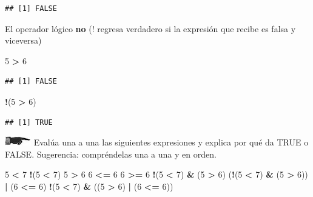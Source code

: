 \documentclass[]{book}
\newenvironment{Shaded}{\begin{snugshade}}{\end{snugshade}}
\newcommand{\DecValTok}[1]{\textcolor[rgb]{0.00,0.00,0.81}{#1}}
\newcommand{\StringTok}[1]{\textcolor[rgb]{0.31,0.60,0.02}{#1}}
\newcommand{\OperatorTok}[1]{\textcolor[rgb]{0.81,0.36,0.00}{\textbf{#1}}}
\newcommand{\NormalTok}[1]{#1}
\theoremstyle{definition}
\theoremstyle{definition}
\theoremstyle{definition}
\theoremstyle{remark}
\begin{document}
\begin{verbatim}
## [1] FALSE
\end{verbatim}

El operador lógico \textbf{no} (! regresa verdadero si la expresión que
recibe es falsa y viceversa)

\begin{Shaded}
\begin{Highlighting}[]
\DecValTok{5} \OperatorTok{>}\StringTok{ }\DecValTok{6}
\end{Highlighting}
\end{Shaded}

\begin{verbatim}
## [1] FALSE
\end{verbatim}

\begin{Shaded}
\begin{Highlighting}[]
\OperatorTok{!}\NormalTok{(}\DecValTok{5} \OperatorTok{>}\StringTok{ }\DecValTok{6}\NormalTok{)}
\end{Highlighting}
\end{Shaded}

\begin{verbatim}
## [1] TRUE
\end{verbatim}

\includegraphics{./imagenes/manicule2.jpg} Evalúa una a una las
siguientes expresiones y explica por qué da TRUE o FALSE. Sugerencia:
compréndelas una a una y en orden.

\begin{Shaded}
\begin{Highlighting}[]
\DecValTok{5} \OperatorTok{<}\StringTok{ }\DecValTok{7}
\OperatorTok{!}\NormalTok{(}\DecValTok{5} \OperatorTok{<}\StringTok{ }\DecValTok{7}\NormalTok{)}
\DecValTok{5} \OperatorTok{>}\StringTok{ }\DecValTok{6}
\DecValTok{6} \OperatorTok{<=}\StringTok{ }\DecValTok{6}
\DecValTok{6} \OperatorTok{>=}\StringTok{ }\DecValTok{6}
\OperatorTok{!}\NormalTok{(}\DecValTok{5} \OperatorTok{<}\StringTok{ }\DecValTok{7}\NormalTok{) }\OperatorTok{&}\StringTok{ }\NormalTok{(}\DecValTok{5} \OperatorTok{>}\StringTok{ }\DecValTok{6}\NormalTok{)}
\NormalTok{(}\OperatorTok{!}\NormalTok{(}\DecValTok{5} \OperatorTok{<}\StringTok{ }\DecValTok{7}\NormalTok{) }\OperatorTok{&}\StringTok{ }\NormalTok{(}\DecValTok{5} \OperatorTok{>}\StringTok{ }\DecValTok{6}\NormalTok{)) }\OperatorTok{|}\StringTok{ }\NormalTok{(}\DecValTok{6} \OperatorTok{<=}\StringTok{ }\DecValTok{6}\NormalTok{)}
\OperatorTok{!}\NormalTok{(}\DecValTok{5} \OperatorTok{<}\StringTok{ }\DecValTok{7}\NormalTok{) }\OperatorTok{&}\StringTok{ }\NormalTok{((}\DecValTok{5} \OperatorTok{>}\StringTok{ }\DecValTok{6}\NormalTok{) }\OperatorTok{|}\StringTok{ }\NormalTok{(}\DecValTok{6} \OperatorTok{<=}\StringTok{ }\DecValTok{6}\NormalTok{))}
\end{Highlighting}
\end{Shaded}
\end{document}
